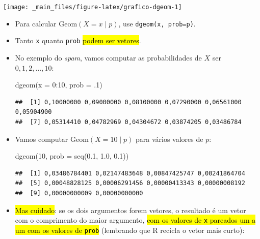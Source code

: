 \documentclass[
  11pt]{report}
\newenvironment{Shaded}{\begin{snugshade}}{\end{snugshade}}
\newcommand{\AttributeTok}[1]{\textcolor[rgb]{0.77,0.63,0.00}{#1}}
\newcommand{\DecValTok}[1]{\textcolor[rgb]{0.00,0.00,0.81}{#1}}
\newcommand{\FloatTok}[1]{\textcolor[rgb]{0.00,0.00,0.81}{#1}}
\newcommand{\FunctionTok}[1]{\textcolor[rgb]{0.00,0.00,0.00}{#1}}
\newcommand{\NormalTok}[1]{#1}
\newcommand{\SpecialCharTok}[1]{\textcolor[rgb]{0.00,0.00,0.00}{#1}}
\renewenvironment{Shaded}{
    \begin{mdframed}[%
      roundcorner=2pt,%
      innerleftmargin=5pt,%
      innerrightmargin=5pt,%
      topline=true,%
      leftline=true,%
      rightline=true,%
      bottomline=true,%
      linewidth=0.5pt,%
      linecolor=black!20,%
      backgroundcolor=black!2,%
      skipabove=2ex,%
      skipbelow=2.5ex%
    ]%
  }
  {
    \end{mdframed}
  }
\begin{document}
\begin{center}\texttt{[image: \_main\_files/figure-latex/grafico-dgeom-1]} \end{center}

\begin{itemize}
\item
  Para calcular $\text{Geom}(X=x \mid p)$, use \texttt{dgeom(x,\ prob=p)}.
\item
  Tanto \texttt{x} quanto \texttt{prob} {\hl{podem ser vetores}}.
\item
  No exemplo do \emph{spam}, vamos computar as probabilidades de $X$ ser $0, 1, 2, \ldots, 10$:

\begin{Shaded}
\begin{Highlighting}[]
\FunctionTok{dgeom}\NormalTok{(}\AttributeTok{x =} \DecValTok{0}\SpecialCharTok{:}\DecValTok{10}\NormalTok{, }\AttributeTok{prob =}\NormalTok{ .}\DecValTok{1}\NormalTok{)}
\end{Highlighting}
\end{Shaded}

\begin{verbatim}
##  [1] 0,10000000 0,09000000 0,08100000 0,07290000 0,06561000 0,05904900
##  [7] 0,05314410 0,04782969 0,04304672 0,03874205 0,03486784
\end{verbatim}
\item
  Vamos computar $\text{Geom}(X=10 \mid p)$ para vários valores de $p$:

\begin{Shaded}
\begin{Highlighting}[]
\FunctionTok{dgeom}\NormalTok{(}\DecValTok{10}\NormalTok{, }\AttributeTok{prob =} \FunctionTok{seq}\NormalTok{(}\FloatTok{0.1}\NormalTok{, }\FloatTok{1.0}\NormalTok{, }\FloatTok{0.1}\NormalTok{))}
\end{Highlighting}
\end{Shaded}

\begin{verbatim}
##  [1] 0,03486784401 0,02147483648 0,00847425747 0,00241864704
##  [5] 0,00048828125 0,00006291456 0,00000413343 0,00000008192
##  [9] 0,00000000009 0,00000000000
\end{verbatim}
\item
  {\hl{Mas cuidado}}: se os dois argumentos forem vetores, o resultado é um vetor com o comprimento do maior argumento, {\hl{com os valores de {\mbox{\texttt{x}}} pareados um a um com os valores de {\mbox{\texttt{prob}}}}} (lembrando que R recicla o vetor mais curto):


\end{itemize}
\end{document}

